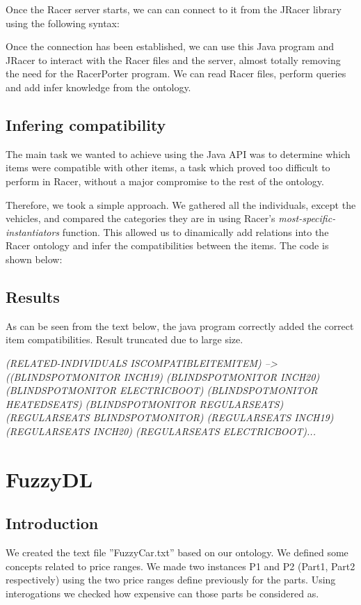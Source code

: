 \documentclass[a4paper,12pt]{report}
\begin{document}
Once the Racer server starts, we can can connect to it from the JRacer library using the following syntax:

\begin{center}
\end{center}

Once the connection has been established, we can use this Java program and JRacer to interact with the Racer files and the server, almost totally removing the need for the RacerPorter program. We can read Racer files, perform queries and add infer knowledge from the ontology.

\section{Infering compatibility}
The main task we wanted to achieve using the Java API was to determine which items were compatible with other items, a task which proved too difficult to perform in Racer, without a major compromise to the rest of the ontology.

Therefore, we took a simple approach. We gathered all the individuals, except the vehicles, and compared the categories they are in using Racer's \textit{most-specific-instantiators} function. This allowed us to dinamically add relations into the Racer ontology and infer the compatibilities between the items. The code is shown below:

\begin{center}
\end{center}

\section{Results}
As can be seen from the text below, the java program correctly added the correct item compatibilities. Result truncated due to large size.

\bigskip
\textit{(RELATED-INDIVIDUALS ISCOMPATIBLEITEMITEM) --> ((BLINDSPOTMONITOR INCH19) (BLINDSPOTMONITOR INCH20) (BLINDSPOTMONITOR ELECTRICBOOT) (BLINDSPOTMONITOR HEATEDSEATS) (BLINDSPOTMONITOR REGULARSEATS) (REGULARSEATS BLINDSPOTMONITOR) (REGULARSEATS INCH19) (REGULARSEATS INCH20) (REGULARSEATS ELECTRICBOOT)...}


\chapter{FuzzyDL}
\section{Introduction}
We created the text file ”FuzzyCar.txt” based on our ontology. We defined some concepts related to price ranges. We made two instances P1 and P2 (Part1, Part2 respectively) using the two price ranges define previously for the parts. Using interogations we checked how expensive can those parts be considered as.
\end{document}
